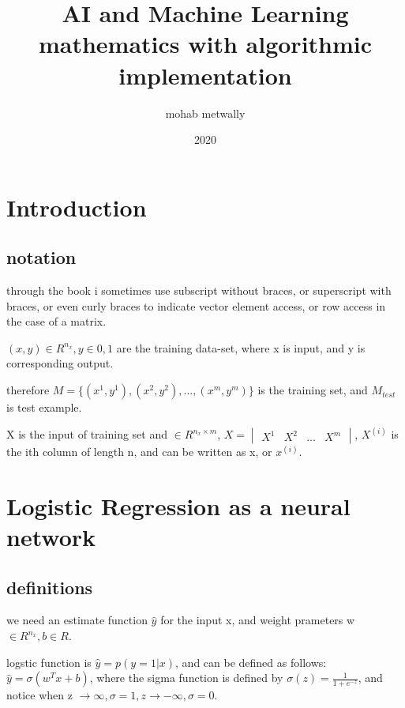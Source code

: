 \documentclass[4apaper,12pt]{book}
\begin{document}
\title{AI and Machine Learning mathematics  with algorithmic implementation}
\author{mohab metwally}
\date{2020}

\maketitle
\tableofcontents

\chapter*{Introduction}

\section{notation}
\begin{description}
  \item through the book i sometimes use subscript without braces, or superscript with braces, or even curly braces to indicate vector element access, or row access in the case of a matrix.
\item $(x, y) \in R^{n_x}, y \in {0,1}$ are the training data-set, where x is input,  and y is corresponding output.
\item therefore $M=\{(x^1, y^1), (x^2, y^2), ..., (x^{m}, y^{m})\}$  is the training set, and $M_{test}$ is test example.
\item X is the input of training set and $\in R^{n_x \times m}$, $X=\begin{vmatrix}X^1&X^2&...&X^{m}\end{vmatrix}$, $X^{(i)}$ is the ith column of length n, and can be written as x, or $x^{(i)}$.
\end{description}

\chapter{Logistic Regression as a neural network}

\section{definitions}

\begin{description}
\item we need an estimate function $\hat{y}$ for the input x, and weight prameters w$\in R^{n_x}, b\in R$.
\item logstic function is $\hat{y}=p(y=1|x)$, and can be defined as follows: $\hat{y}=\sigma(w^Tx+b)$, where the sigma function is defined by $\sigma(z)=\frac{1}{1+e^{-z}}$, and notice when z $\to \infty, \sigma = 1, z \to -\infty, \sigma =0$.
\item
\end{description}
\end{document}
